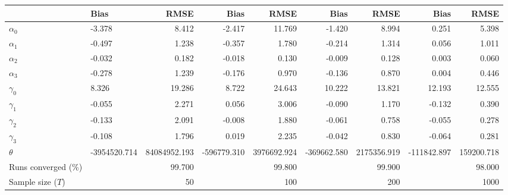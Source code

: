 
\begin{tabular}[t]{llrrrrrrr}
\toprule
  & Bias & RMSE & Bias & RMSE & Bias & RMSE & Bias & RMSE\\
\midrule
$\alpha_{0}$ & -3.378 & 8.412 & -2.417 & 11.769 & -1.420 & 8.994 & 0.251 & 5.398\\
$\alpha_{1}$ & -0.497 & 1.238 & -0.357 & 1.780 & -0.214 & 1.314 & 0.056 & 1.011\\
$\alpha_{2}$ & -0.032 & 0.182 & -0.018 & 0.130 & -0.009 & 0.128 & 0.003 & 0.060\\
$\alpha_{3}$ & -0.278 & 1.239 & -0.176 & 0.970 & -0.136 & 0.870 & 0.004 & 0.446\\
$\gamma_{0}$ & 8.326 & 19.286 & 8.722 & 24.643 & 10.222 & 13.821 & 12.193 & 12.555\\
$\gamma_{1}$ & -0.055 & 2.271 & 0.056 & 3.006 & -0.090 & 1.170 & -0.132 & 0.390\\
$\gamma_{2}$ & -0.133 & 2.091 & -0.008 & 1.880 & -0.061 & 0.758 & -0.055 & 0.278\\
$\gamma_{3}$ & -0.108 & 1.796 & 0.019 & 2.235 & -0.042 & 0.830 & -0.064 & 0.281\\
$\theta$ & -3954520.714 & 84084952.193 & -596779.310 & 3976692.924 & -369662.580 & 2175356.919 & -111842.897 & 159200.718\\
Runs converged (\%) &  & 99.700 &  & 99.800 &  & 99.900 &  & 98.000\\
Sample size ($T$) &  & 50 &  & 100 &  & 200 &  & 1000\\
\bottomrule
\end{tabular}
